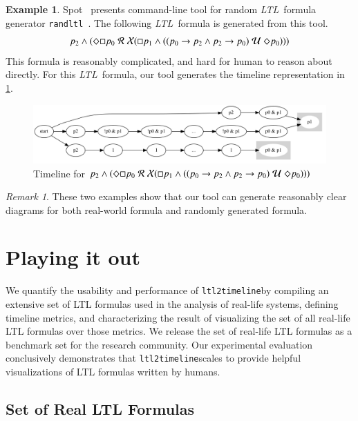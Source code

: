 \documentclass[preprint,12pt]{elsarticle}
\theoremstyle{definition}
\newtheorem{example}{Example}[section]
\theoremstyle{remark}
\newtheorem{remark}{Remark}[section]
\newcommand{\always}{\Box}
\newcommand{\eventually}{\Diamond}
\newcommand{\nextt}{\mathcal{X}}
\newcommand{\limplies}{\rightarrow}
\newcommand{\ltl}{\textit{LTL}}
\newcommand{\stronguntil}{\hspace{0.1cm} \mathcal{U}  \hspace{0.1cm}}
\newcommand{\weakrelease}{\hspace{0.1cm} \mathcal{R} \hspace{0.1cm}}
\newcommand{\tool}{\hspace{0.1cm}\texttt{ltl2timeline}\hspace{0.1cm}}
\begin{document}
\begin{example}
    Spot~\cite{SPOT-online} presents command-line tool for random \ltl\ formula generator \texttt{randltl}~\cite{duret.13.atva}. The following \ltl\ formula is generated from this tool.
    \[
    p_2 \land (\eventually \always p_0 \weakrelease \nextt(\always p_1 \land ((p_0 \limplies p_2 \land p_2 \limplies p_0) \stronguntil \eventually p_0)))
    \]
    This formula is reasonably complicated, and hard for human to reason about directly. For this \ltl\ formula, our tool generates the timeline representation in \cref{fig:ex13}.
    \begin{figure}[h!]
        \centering
        \includegraphics[scale=0.3]{examples/ex13/ex13.png}
        \caption{Timeline for $p_2 \land (\eventually \always p_0 \weakrelease \nextt(\always p_1 \land ((p_0 \limplies p_2 \land p_2 \limplies p_0) \stronguntil \eventually p_0)))$}
        \label{fig:ex13}
    \end{figure}
\end{example}
\begin{remark}
    These two examples show that our tool can generate reasonably clear diagrams for both real-world formula and randomly generated formula.
\end{remark}

\section{Playing it out} \label{sec:playing}%

We quantify the usability and performance of \tool by compiling an extensive set of LTL formulas used in the analysis of real-life systems, defining timeline metrics, and characterizing the result of visualizing the set of all real-life LTL formulas over those metrics. We release the set of real-life LTL formulas as a benchmark set for the research community. Our experimental evaluation conclusively demonstrates that \tool scales to provide helpful visualizations of LTL formulas written by humans.

\subsection{Set of Real LTL Formulas}
\end{document}
